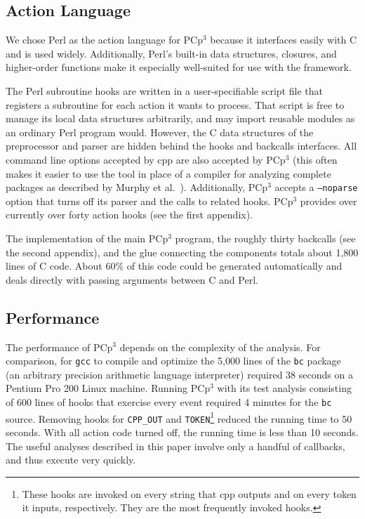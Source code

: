 \documentclass{article}
\newcommand{\pcp}{\mbox{\textsf{PCp}$^3$}}
\newcommand{\Cpp}{\mbox{\textsf{cpp}}}
\newcommand{\Perl}{\mbox{Perl}}
\newcommand{\C}{\mbox{C}}
\begin{document}
\subsection*{Action Language}
\label{sec:perl_action_lang}

\nopagebreak

We chose \Perl{} as the action language for \pcp{} because it interfaces
easily with \C{} and is used widely.  Additionally, \Perl{}'s built-in
data structures, closures, and higher-order functions make it especially 
well-suited for use with the framework.

The \Perl{} subroutine hooks are written in a user-specifiable script
file that registers a subroutine for each action it wants to process.
That script is free to manage its local data structures arbitrarily, and
may import reusable modules as an ordinary \Perl{} program would.  However, the
\C{} data structures of the preprocessor and parser are hidden behind
the hooks and backcalls interfaces. All command line options accepted by
\Cpp{} are also accepted by \pcp{} (this often makes it easier to use
the tool in place of a compiler for analyzing complete packages as
described by Murphy et al.~\cite{Murphy98}).  Additionally, \pcp{}
accepts a \texttt{--noparse} option that turns off its parser and the
calls to related hooks.  \pcp{} provides over currently over forty action
hooks (see the first appendix).

The implementation of the main \pcp{} program, the roughly thirty
backcalls (see the second appendix),
and the glue connecting the components totals about 1,800
lines of \C{} code.  About 60\% of this code could be generated automatically
and deals directly with passing
arguments between \C{} and \Perl{}.

\subsection*{Performance}
\label{sec:pcp3_performance}
The performance of \pcp{} depends on the complexity of the
analysis.  For comparison, for \texttt{gcc} to compile and optimize the
5,000 lines of the \texttt{bc} package~\cite{bc} (an arbitrary precision
arithmetic language interpreter) required 38 seconds on a Pentium Pro
200 Linux machine.  Running \pcp{} with its test analysis consisting of
600 lines of hooks that exercise every event required 4 minutes for the
\texttt{bc} source.  Removing hooks for \texttt{CPP\_OUT} and
\texttt{TOKEN}\footnote{These hooks are invoked on every string that
  \Cpp{} outputs and on every token it inputs, respectively.  They are
  the most frequently invoked hooks.} reduced the running time to 50
seconds.  With all action code turned off, the running time is 
less than 10 seconds.  The useful analyses described in this paper involve
only a handful of callbacks, and thus execute very quickly.
\end{document}
